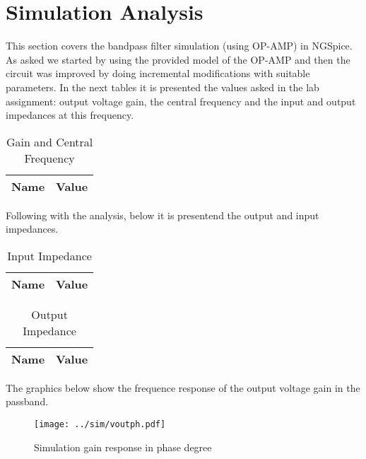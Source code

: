 \section{Simulation Analysis}
\label{sec:simulation}

\hspace{0,5cm} This section covers the bandpass filter simulation (using OP-AMP) in NGSpice. As asked we started by using the provided model of the OP-AMP and then the circuit was improved by doing incremental modifications with suitable parameters. In the next tables it is presented the values asked in the lab assignment: output voltage gain, the central frequency and the input and output impedances at this frequency.

\begin{table}[H]
  \centering
  \begin{tabular}{|l|r|}
    \hline    
    {\bf Name} & {\bf Value } \\ \hline
    
  \end{tabular}
  \caption{Gain and Central Frequency}
  \label{tab:ng3}
\end{table}

\par Following with the analysis, below it is presentend the output and input impedances.

\begin{table}[H]
  \centering
  \begin{tabular}{|l|r|}
    \hline    
    {\bf Name} & {\bf Value } \\ \hline
    
  \end{tabular}
  \caption{Input Impedance}
  \label{tab:ng4}
\end{table}

\begin{table}[H]
  \centering
  \begin{tabular}{|l|r|}
    \hline    
    {\bf Name} & {\bf Value } \\ \hline
    
  \end{tabular}
  \caption{Output Impedance}
  \label{tab:ng4}
\end{table}

\par The graphics below show the frequence response of the output voltage gain in the passband.

\begin{figure}[H] \centering
\texttt{[image: ../sim/voutph.pdf]}
\caption{Simulation gain response in phase degree}
\label{fig:ng1}
\end{figure}

